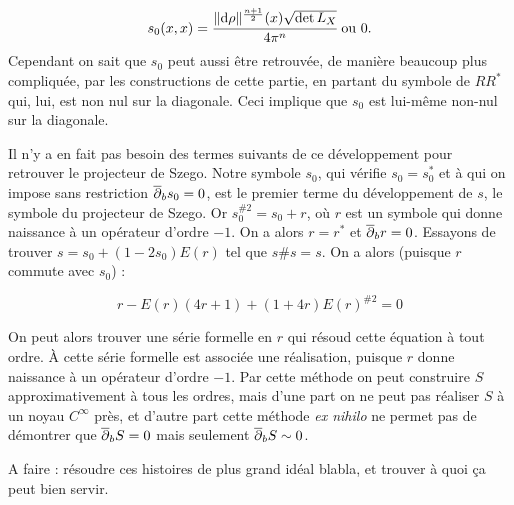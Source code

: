 \begin{equation*}
  s_0(x,x) = \cfrac{\|\mathrm{d}\rho\|^{\frac{n+1}{2}}(x)\sqrt{\det L_X}}{4\pi^n} \text{ ou } 0.
\end{equation*}
Cependant on sait que $s_0$ peut aussi être retrouvée, de manière beaucoup plus compliquée, par les constructions de cette partie, en partant du symbole de $RR^*$ qui, lui, est non nul sur la diagonale. Ceci implique que $s_0$ est lui-même non-nul sur la diagonale.

Il n'y a en fait pas besoin des termes suivants de ce développement pour retrouver le projecteur de Szego. Notre symbole $s_0$, qui vérifie $s_0 = s_0^*$ et à qui on impose sans restriction $\overline{\partial}_b s_0=0$, est le premier terme du développement de $s$, le symbole du projecteur de Szego. Or $s_0^{\#2}=s_0+r$, où $r$ est un symbole qui donne naissance à un opérateur d'ordre $-1$. On a alors $r=r^*$ et $\overline{\partial}_b r=0$. Essayons de trouver $s=s_0+(1-2s_0)E(r)$ tel que $s\#s=s$. On a alors (puisque $r$ commute avec $s_0$) :

\begin{equation*}
  r-E(r)(4r+1)+(1 + 4r)E(r)^{\#2}= 0
\end{equation*}

On peut alors trouver une série formelle en $r$ qui résoud cette équation à tout ordre. À cette série formelle est associée une réalisation, puisque $r$ donne naissance à un opérateur d'ordre $-1$. Par cette méthode on peut construire $S$ approximativement à tous les ordres, mais d'une part on ne peut pas réaliser $S$ à un noyau $C^{\infty}$ près, et d'autre part cette méthode \emph{ex nihilo} ne permet pas de démontrer que $\overline{\partial}_b S=0$ mais seulement $\overline{\partial}_b S \sim 0$.

A faire : résoudre ces histoires de plus grand idéal blabla, et trouver à quoi ça peut bien servir.
